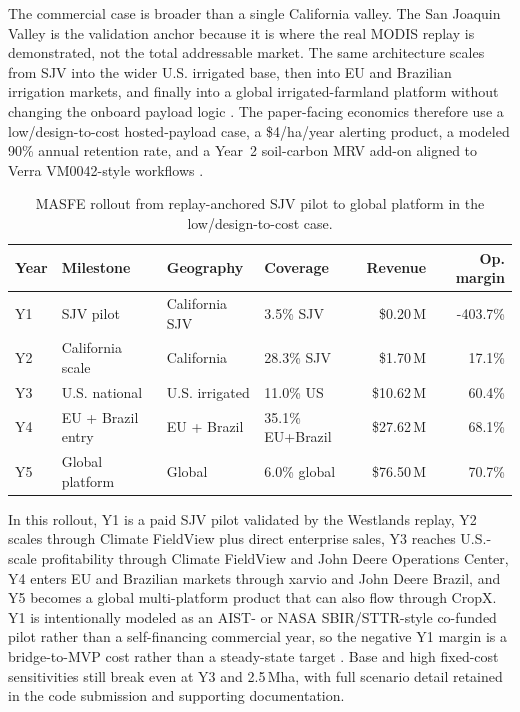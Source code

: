 \documentclass[11pt,letterpaper]{article}
\begin{document}
The commercial case is broader than a single California valley. The San Joaquin Valley is the validation anchor because it is where the real MODIS replay is demonstrated, not the total addressable market. The same architecture scales from SJV into the wider U.S. irrigated base, then into EU and Brazilian irrigation markets, and finally into a global irrigated-farmland platform without changing the onboard payload logic \cite{usda-2022,eurostat-farms,ana-atlas,fao-aquastat}. The paper-facing economics therefore use a low/design-to-cost hosted-payload case, a \$4/ha/year alerting product, a modeled 90\% annual retention rate, and a Year~2 soil-carbon MRV add-on aligned to Verra VM0042-style workflows \cite{climate-pricing,verra-vm0042}.

\begin{table}[H]
\centering
\caption{MASFE rollout from replay-anchored SJV pilot to global platform in the low/design-to-cost case.}
\label{tab:unit-econ}
\small
\begin{tabular}{llp{2.15cm}lrr}
\toprule
Year & Milestone & Geography & Coverage & Revenue & Op. margin \\
\midrule
Y1 & SJV pilot & California SJV & 3.5\% SJV & \$0.20\,M & -403.7\% \\
Y2 & California scale & California & 28.3\% SJV & \$1.70\,M & 17.1\% \\
Y3 & U.S. national & U.S. irrigated & 11.0\% US & \$10.62\,M & 60.4\% \\
Y4 & EU + Brazil entry & EU + Brazil & 35.1\% EU+Brazil & \$27.62\,M & 68.1\% \\
Y5 & Global platform & Global & 6.0\% global & \$76.50\,M & 70.7\% \\
\bottomrule
\end{tabular}
\end{table}

In this rollout, Y1 is a paid SJV pilot validated by the Westlands replay, Y2 scales through Climate FieldView plus direct enterprise sales, Y3 reaches U.S.-scale profitability through Climate FieldView and John Deere Operations Center, Y4 enters EU and Brazilian markets through xarvio and John Deere Brazil, and Y5 becomes a global multi-platform product that can also flow through CropX. Y1 is intentionally modeled as an AIST- or NASA SBIR/STTR-style co-funded pilot rather than a self-financing commercial year, so the negative Y1 margin is a bridge-to-MVP cost rather than a steady-state target \cite{nasa-aist,nasa-sbir}. Base and high fixed-cost sensitivities still break even at Y3 and 2.5\,Mha, with full scenario detail retained in the code submission and supporting documentation.
\end{document}
